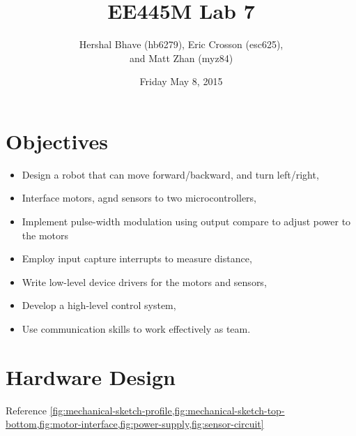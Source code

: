 \documentclass[12pt]{article}
\title{EE445M Lab 7}
\author{Hershal Bhave (hb6279), Eric Crosson (esc625), \\
  and Matt Zhan (myz84)}
\date{Friday May 8, 2015}
\begin{document}
\maketitle

\section{Objectives}

\begin{itemize}
\item Design a robot that can move forward/backward, and turn left/right,
\item Interface motors, agnd sensors to two microcontrollers,
\item Implement pulse-width modulation using output compare to adjust power to the motors
\item Employ input capture interrupts to measure distance,
\item Write low-level device drivers for the motors and sensors,
\item Develop a high-level control system,
\item Use communication skills to work effectively as team.
\end{itemize}

\section{Hardware Design}
Reference \cref{fig:mechanical-sketch-profile,fig:mechanical-sketch-top-bottom,fig:motor-interface,fig:power-supply,fig:sensor-circuit}
\end{document}
